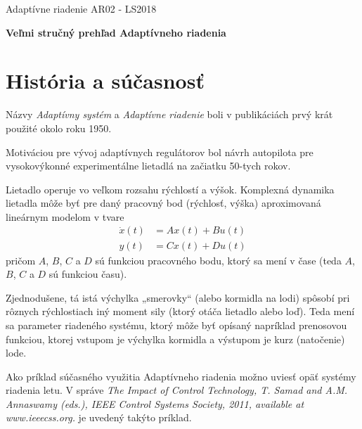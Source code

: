\documentclass[a4paper, 10pt, ]{article}
\def\oznacenieCasti{AR02 - LS2018}
\begin{document}
\fontsize{12pt}{22pt}\selectfont

\centerline{\textsf{Adaptívne riadenie} \hfill \textsf{\oznacenieCasti}}

\fontsize{18pt}{22pt}\selectfont





\begin{flushleft}
	\textbf{\textsf{Veľmi stručný prehľad Adaptívneho riadenia}}
\end{flushleft}





\normalsize

\bigskip

\tableofcontents

\bigskip

\vspace{18pt}




\section{História a súčasnosť}

Názvy \emph{Adaptívny systém} a \emph{Adaptívne riadenie} boli v publikáciách prvý krát použité okolo roku 1950.

Motiváciou pre vývoj adaptívnych regulátorov bol návrh autopilota pre vysokovýkonné experimentálne lietadlá na začiatku 50-tych rokov.

Lietadlo operuje vo veľkom rozsahu rýchlostí a výšok. Komplexná dynamika lietadla môže byť pre daný pracovný bod (rýchlosť, výška) aproximovaná lineárnym modelom v tvare
\begin{align}
	\dot{x}(t) &= A x(t) + B u(t)  \\
	y(t) &= C x(t) + D u(t)
\end{align}
pričom $A$, $B$, $C$ a $D$ sú funkciou pracovného bodu, ktorý sa mení v čase (teda $A$, $B$, $C$ a $D$ sú funkciou času).

Zjednodušene, tá istá výchylka „smerovky“ (alebo kormidla na lodi) spôsobí pri rôznych rýchlostiach iný moment sily (ktorý otáča lietadlo alebo loď). Teda mení sa parameter riadeného systému, ktorý môže byť opísaný napríklad prenosovou funkciou, ktorej vstupom je výchylka kormidla a výstupom je kurz (natočenie) lode.

\bigskip

\noindent
Ako príklad súčasného využitia Adaptívneho riadenia možno uviesť opäť systémy riadenia letu. V správe \emph{The Impact of Control Technology, T. Samad and A.M. Annaswamy (eds.), IEEE Control Systems Society, 2011, available at www.ieeecss.org.} je uvedený takýto príklad.
\end{document}
